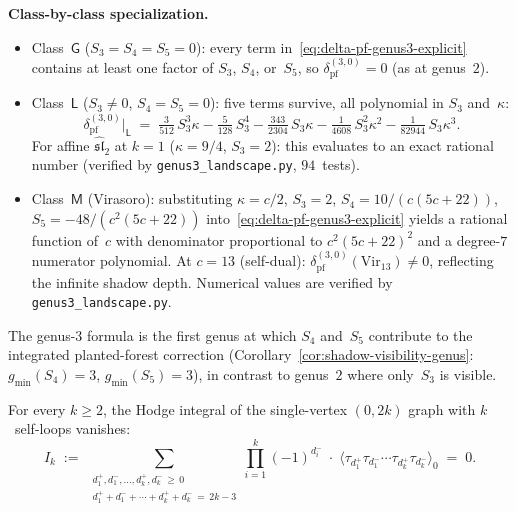 \begin{remark}
\begin{itemize}
  \smallskip\noindent\textbf{Class-by-class specialization.}
  \begin{itemize}
  \item
    Class~$\mathsf{G}$ ($S_3 = S_4 = S_5 = 0$):
    every term in~\eqref{eq:delta-pf-genus3-explicit}
    contains at least one factor of $S_3$, $S_4$, or~$S_5$,
    so $\delta_{\mathrm{pf}}^{(3,0)} = 0$
    (as at genus~$2$).
  \item
    Class~$\mathsf{L}$ ($S_3 \neq 0$, $S_4 = S_5 = 0$):
    five terms survive, all polynomial in $S_3$ and~$\kappa$:
    \[
    \delta_{\mathrm{pf}}^{(3,0)}\big|_{\mathsf{L}}
    \;=\;
    \tfrac{3}{512}\,S_3^3\kappa
    - \tfrac{5}{128}\,S_3^4
    - \tfrac{343}{2304}\,S_3\kappa
    - \tfrac{1}{4608}\,S_3^2\kappa^2
    - \tfrac{1}{82944}\,S_3\kappa^3.
    \]
    For affine $\widehat{\mathfrak{sl}}_2$ at $k=1$
    ($\kappa = 9/4$, $S_3 = 2$):
    this evaluates to an exact rational number
    (verified by \texttt{genus3\_landscape.py},
    $94$~tests).
  \item
    Class~$\mathsf{M}$ (Virasoro):
    substituting $\kappa = c/2$, $S_3 = 2$,
    $S_4 = 10/(c(5c{+}22))$,
    $S_5 = -48/(c^2(5c{+}22))$
    into~\eqref{eq:delta-pf-genus3-explicit}
    yields a rational function of~$c$ with denominator
    proportional to $c^2(5c{+}22)^2$ and a degree-$7$
    numerator polynomial.
    At $c = 13$ (self-dual):
    $\delta_{\mathrm{pf}}^{(3,0)}(\mathrm{Vir}_{13}) \neq 0$,
    reflecting the infinite shadow depth.
    Numerical values are verified by
    \texttt{genus3\_landscape.py}.
  \end{itemize}
  The genus-$3$ formula is the first genus at which
  $S_4$ and~$S_5$ contribute to the integrated planted-forest
  correction
  (Corollary~\ref{cor:shadow-visibility-genus}:
  $g_{\min}(S_4) = 3$, $g_{\min}(S_5) = 3$), in contrast to
  genus~$2$ where only~$S_3$ is visible.
\end{itemize}
\end{remark}

\begin{proposition}
\label{prop:self-loop-vanishing}
\ClaimStatusProvedHere
{}
For every $k \geq 2$, the Hodge integral of the single-vertex
$(0,2k)$ graph with $k$~self-loops vanishes:
\begin{equation}\label{eq:self-loop-vanishing}
I_k
\;:=\;
\sum_{\substack{d_1^+,d_1^-,\ldots,d_k^+,d_k^- \,\geq\, 0 \\
d_1^+ + d_1^- + \cdots + d_k^+ + d_k^- \,=\, 2k-3}}
\prod_{i=1}^{k} (-1)^{d_i^-}
\;\cdot\;
\bigl\langle
\tau_{d_1^+}\tau_{d_1^-}\cdots\tau_{d_k^+}\tau_{d_k^-}
\bigr\rangle_0
\;=\; 0.
\end{equation}
\end{proposition}

